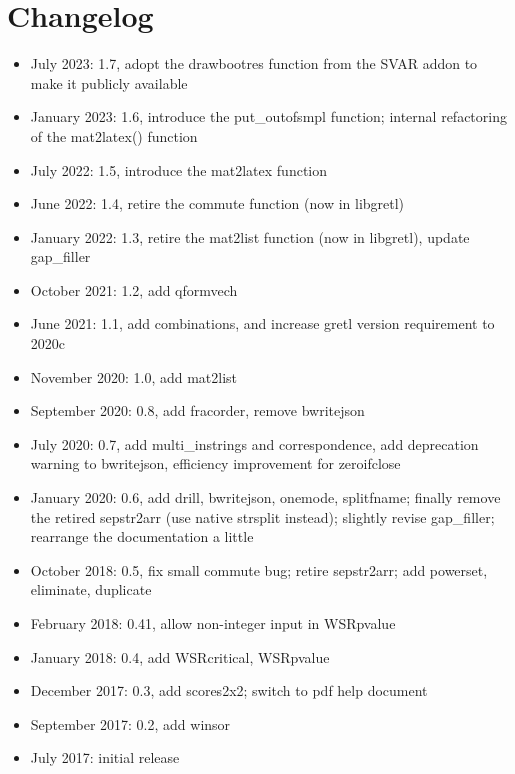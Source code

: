 \documentclass[11pt,english]{article}
\begin{document}
\section{Changelog }
\begin{itemize}
\item July 2023: 1.7, adopt the drawbootres function from the SVAR addon 
  to make it publicly available  
\item January 2023: 1.6, introduce the put\_outofsmpl function; internal
  refactoring of the mat2latex() function
\item July 2022: 1.5, introduce the mat2latex function
\item June 2022: 1.4, retire the commute function (now in libgretl)
\item January 2022: 1.3, retire the mat2list function (now in
  libgretl), update gap\_filler
\item October 2021: 1.2, add qformvech
\item June 2021: 1.1, add combinations, and increase gretl version requirement
  to 2020c
\item November 2020: 1.0, add mat2list
\item September 2020: 0.8, add fracorder, remove bwritejson
\item July 2020: 0.7, add multi\_instrings and correspondence, add deprecation
  warning to bwritejson, efficiency improvement for zeroifclose
\item January 2020: 0.6, add drill, bwritejson, onemode, splitfname;
  finally remove the retired sepstr2arr (use native strsplit instead);
  slightly revise gap\_filler; rearrange the documentation a little
\item October 2018: 0.5, fix small commute bug; retire sepstr2arr; add 
  powerset, eliminate, duplicate
\item February 2018: 0.41, allow non-integer input in WSRpvalue
\item January 2018: 0.4, add WSRcritical, WSRpvalue
\item December 2017: 0.3, add scores2x2; switch to pdf help document
\item September 2017: 0.2, add winsor
\item July 2017: initial release
\end{itemize}
\end{document}
